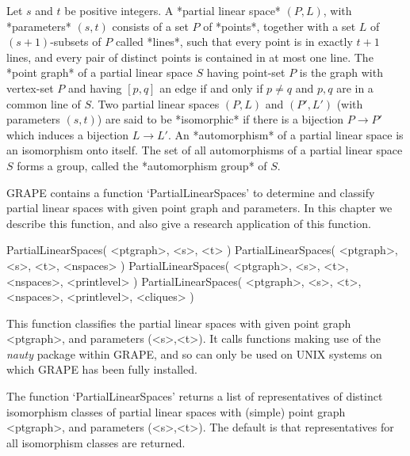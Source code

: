 %
%
%
%
\def\GRAPE{\sf GRAPE}
\def\nauty{\it nauty}
\def\G{\Gamma}
\def\Aut{{\rm Aut}\,}
\def\x{\times}


Let $s$ and  $t$  be positive integers. A *partial linear space*
$(P,L)$, with *parameters* $(s,t)$ consists of a set $P$ of *points*,
together with a set $L$ of $(s+1)$-subsets of $P$ called *lines*,
such that every point is in exactly $t+1$ lines, and every pair of
distinct points is contained in at most one line.  The *point graph*
of a partial linear space $S$ having point-set $P$ is the graph with
vertex-set $P$ and having $[p,q]$ an edge if and only if $p\not=q$ and
$p,q$ are in a common line of $S$. Two partial linear spaces $(P,L)$
and $(P',L')$ (with parameters $(s,t)$) are said to be *isomorphic*
if there is a bijection $P\to P'$ which induces a bijection $L\to L'$.
An *automorphism* of a partial linear space is an isomorphism onto itself.
The set of all automorphisms of a partial linear space $S$ forms a group,
called the *automorphism group* of $S$.

{\GRAPE} contains a function `PartialLinearSpaces' to determine and
classify partial linear spaces with given point graph and parameters.
In this chapter we describe this function, and also give a research
application of this function.


\>PartialLinearSpaces( <ptgraph>, <s>, <t> )
\>PartialLinearSpaces( <ptgraph>, <s>, <t>, <nspaces> )
\>PartialLinearSpaces( <ptgraph>, <s>, <t>, <nspaces>, <printlevel> )
\>PartialLinearSpaces( <ptgraph>, <s>, <t>, <nspaces>, <printlevel>, <cliques> )

This function classifies the partial linear spaces with given point graph
<ptgraph>, and parameters (<s>,<t>). It calls functions making use of
the {\nauty} package within {\GRAPE}, and so can only be used on UNIX
systems on which {\GRAPE} has been fully installed.

The function `PartialLinearSpaces' returns a list of representatives
of distinct isomorphism classes of partial linear spaces with (simple)
point graph <ptgraph>, and parameters (<s>,<t>). The default is that
representatives for all isomorphism classes are returned.

